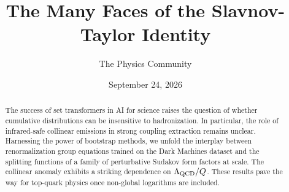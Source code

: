 \documentclass[11pt]{article}
\title{The Many Faces of the Slavnov-Taylor Identity}
\author{The Physics Community}
\date{September 24, 2026}
\begin{document}
\maketitle
\begin{abstract}
The success of set transformers in AI for science raises the question of
whether cumulative distributions can be insensitive to hadronization. In
particular, the role of infrared-safe collinear emissions in strong
coupling extraction remains unclear. Harnessing the power of bootstrap
methods, we unfold the interplay between renormalization group equations
trained on the Dark Machines dataset and the splitting functions of a
family of perturbative Sudakov form factors at scale. The collinear
anomaly exhibits a striking dependence on $\Lambda_{\rm QCD}/Q$. These
results pave the way for top-quark physics once non-global logarithms
are included.
\end{abstract}
\tableofcontents



\nocite{*}


\end{document}

